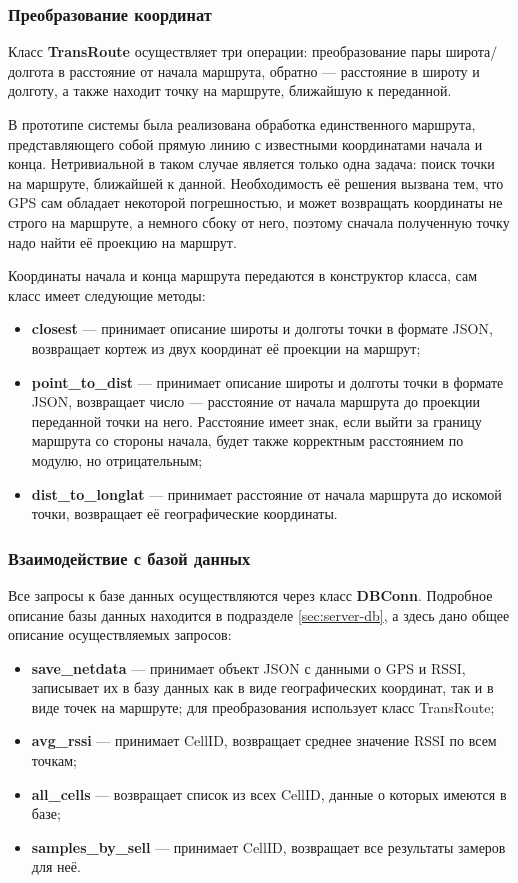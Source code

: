 \subsubsection{Преобразование координат}
\label{subsubsec:transroute}
Класс {\bf TransRoute} осуществляет три операции: преобразование пары широта/долгота в расстояние от начала маршрута, обратно --- расстояние в широту и долготу, а также находит точку на маршруте, ближайшую к переданной.

В прототипе системы была реализована обработка единственного маршрута, представляющего собой прямую линию с известными координатами начала и конца. Нетривиальной в таком случае является только одна задача: поиск точки на маршруте, ближайшей к данной. Необходимость её решения вызвана тем, что GPS сам обладает некоторой погрешностью, и может возвращать координаты не строго на маршруте, а немного сбоку от него, поэтому сначала полученную точку надо найти её проекцию на маршрут.

Координаты начала и конца маршрута передаются в конструктор класса, сам класс имеет следующие методы:

\begin{itemize}
	\item
		{\bf closest} --- принимает описание широты и долготы точки в формате JSON, возвращает кортеж из двух координат её проекции на маршрут;
	\item
		{\bf point\_to\_dist} --- принимает описание широты и долготы точки в формате JSON, возвращает число --- расстояние от начала маршрута до проекции переданной точки на него. Расстояние имеет знак, если выйти за границу маршрута со стороны начала, будет также корректным расстоянием по модулю, но отрицательным;
	\item
		{\bf dist\_to\_longlat} --- принимает расстояние от начала маршрута до искомой точки, возвращает её географические координаты.
\end{itemize}

\subsubsection{Взаимодействие с базой данных}
Все запросы к базе данных осуществляются через класс {\bf DBConn}. Подробное описание базы данных находится в подразделе \ref{sec:server-db}, а здесь дано общее описание осуществляемых запросов:
\begin{itemize}
	\item
		{\bf save\_netdata} --- принимает объект JSON с данными о GPS и RSSI, записывает их в базу данных как в виде географических координат, так и в виде точек на маршруте; для преобразования использует класс TransRoute;
	\item
		{\bf avg\_rssi} --- принимает CellID, возвращает среднее значение RSSI по всем точкам;
	\item
		{\bf all\_cells} --- возвращает список из всех CellID, данные о которых имеются в базе;
	\item
		{\bf samples\_by\_sell} --- принимает CellID, возвращает все результаты замеров для неё.
\end{itemize}

